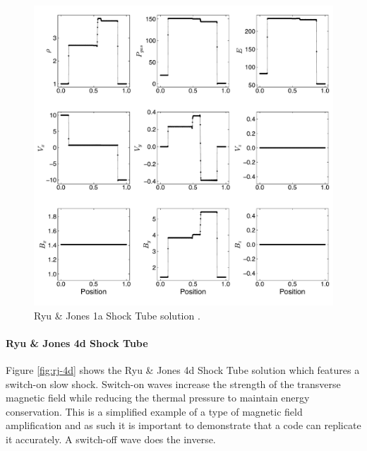 \documentclass[modern, linenumbers]{aastex631}
\newcommand*{\img}[1]{%
    \raisebox{-.05\baselineskip}{%
        \texttt{[image: \#1]}%
    }%
}
\begin{document}
\begin{figure}[ht!]
    \includegraphics[width=\linewidth]{rj1a.pdf}
    \caption{Ryu \& Jones 1a Shock Tube solution \citep{ryu_jones_1995}.
    \href{https://zenodo.org/records/10927223}{\img{zenodo-gradient-200.png}}}
    \label{fig:rj-1a}
\end{figure}

\paragraph{Ryu \& Jones 4d Shock Tube}
Figure \ref{fig:rj-4d} shows the Ryu \& Jones 4d Shock Tube solution \citep{ryu_jones_1995} which features a switch-on slow shock. Switch-on waves increase the strength of the transverse magnetic field while reducing the thermal pressure to maintain energy conservation. This is a simplified example of a type of magnetic field amplification and as such it is important to demonstrate that a code can replicate it accurately. A switch-off wave does the inverse.
\end{document}
